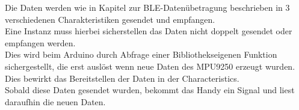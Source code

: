Die Daten werden wie in Kapitel zur BLE-Datenübetragung beschrieben in 
3 verschiedenen Charakteristiken gesendet und empfangen. \\
Eine Instanz muss hierbei sicherstellen das Daten
nicht doppelt gesendet oder empfangen werden.\\
Dies wird beim Arduino durch Abfrage einer Bibliothekseigenen Funktion
sichergestellt, die erst auslöst wenn neue Daten des MPU9250 erzeugt wurden. Dies bewirkt
das Bereitstellen der Daten in der Characteristics.\\
Sobald diese Daten gesendet wurden, bekommt das Handy ein Signal und liest
daraufhin die neuen Daten.\\
